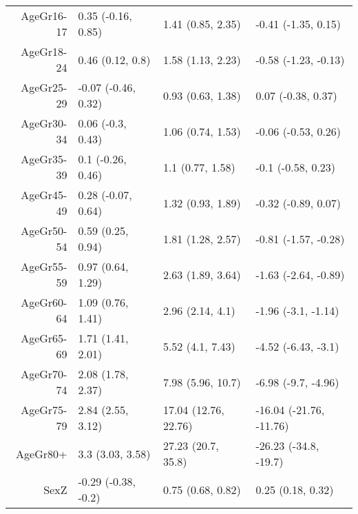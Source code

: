 \begin{table}[ht]
\begin{tabular}{rlll}
  AgeGr16-17 & 0.35 (-0.16, 0.85) & 1.41 (0.85, 2.35) & -0.41 (-1.35, 0.15) \\ 
  AgeGr18-24 & 0.46 (0.12, 0.8) & 1.58 (1.13, 2.23) & -0.58 (-1.23, -0.13) \\ 
  AgeGr25-29 & -0.07 (-0.46, 0.32) & 0.93 (0.63, 1.38) & 0.07 (-0.38, 0.37) \\ 
  AgeGr30-34 & 0.06 (-0.3, 0.43) & 1.06 (0.74, 1.53) & -0.06 (-0.53, 0.26) \\ 
  AgeGr35-39 & 0.1 (-0.26, 0.46) & 1.1 (0.77, 1.58) & -0.1 (-0.58, 0.23) \\ 
  AgeGr45-49 & 0.28 (-0.07, 0.64) & 1.32 (0.93, 1.89) & -0.32 (-0.89, 0.07) \\ 
  AgeGr50-54 & 0.59 (0.25, 0.94) & 1.81 (1.28, 2.57) & -0.81 (-1.57, -0.28) \\ 
  AgeGr55-59 & 0.97 (0.64, 1.29) & 2.63 (1.89, 3.64) & -1.63 (-2.64, -0.89) \\ 
  AgeGr60-64 & 1.09 (0.76, 1.41) & 2.96 (2.14, 4.1) & -1.96 (-3.1, -1.14) \\ 
  AgeGr65-69 & 1.71 (1.41, 2.01) & 5.52 (4.1, 7.43) & -4.52 (-6.43, -3.1) \\ 
  AgeGr70-74 & 2.08 (1.78, 2.37) & 7.98 (5.96, 10.7) & -6.98 (-9.7, -4.96) \\ 
  AgeGr75-79 & 2.84 (2.55, 3.12) & 17.04 (12.76, 22.76) & -16.04 (-21.76, -11.76) \\ 
  AgeGr80+ & 3.3 (3.03, 3.58) & 27.23 (20.7, 35.8) & -26.23 (-34.8, -19.7) \\ 
  SexZ & -0.29 (-0.38, -0.2) & 0.75 (0.68, 0.82) & 0.25 (0.18, 0.32) \\ 
   \hline
\end{tabular}
\end{table}
